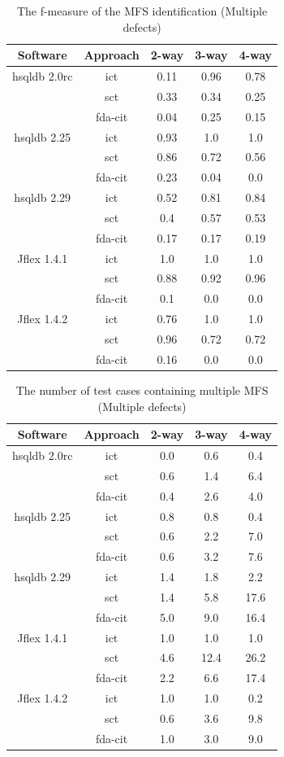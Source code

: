 \documentclass[journal,12pt,onecolumn,draftclsnofoot,]{IEEEtran}
\begin{document}
\begin{table}[ht]
\caption{The f-measure of the MFS identification (Multiple defects)}
\label{multiple_tdefects_identification}
\centering
\begin{tabular}{|c|c|c|c|c|} \hline
Software&  Approach & 2-way & 3-way & 4-way\\ \hline
hsqldb 2.0rc	&ict	&0.11	&0.96	&0.78	\\
	&sct	&0.33	&0.34	&0.25	\\
	&fda-cit	&0.04	&0.25	&0.15	\\  \hline
hsqldb 2.25	&ict	&0.93	&1.0	&1.0	\\
	&sct	&0.86	&0.72	&0.56	\\
	&fda-cit	&0.23	&0.04	&0.0	\\  \hline
hsqldb 2.29	&ict	&0.52	&0.81	&0.84	\\
	&sct	&0.4	&0.57	&0.53	\\
	&fda-cit	&0.17	&0.17	&0.19	\\  \hline
Jflex 1.4.1	&ict	&1.0	&1.0	&1.0	\\
	&sct	&0.88	&0.92	&0.96	\\
	&fda-cit	&0.1	&0.0	&0.0	\\  \hline
Jflex 1.4.2	&ict	&0.76	&1.0	&1.0	\\
	&sct	&0.96	&0.72	&0.72	\\
	&fda-cit	&0.16	&0.0	&0.0	\\  \hline
\end{tabular}
\end{table}



\begin{table}[ht]
\caption{The number of test cases containing multiple MFS (Multiple defects)}
\label{multiple_tdefects_tests_multiple}
\centering
\begin{tabular}{|c|c|c|c|c|} \hline
Software&  Approach & 2-way & 3-way & 4-way\\ \hline
hsqldb 2.0rc	&ict	&0.0	&0.6	&0.4	\\
	&sct	&0.6	&1.4	&6.4	\\
	&fda-cit	&0.4	&2.6	&4.0	\\ \hline
hsqldb 2.25	&ict	&0.8	&0.8	&0.4	\\
	&sct	&0.6	&2.2	&7.0	\\
	&fda-cit	&0.6	&3.2	&7.6	\\ \hline
hsqldb 2.29	&ict	&1.4	&1.8	&2.2	\\
	&sct	&1.4	&5.8	&17.6	\\
	&fda-cit	&5.0	&9.0	&16.4	\\ \hline
Jflex 1.4.1	&ict	&1.0	&1.0	&1.0	\\
	&sct	&4.6	&12.4	&26.2	\\
	&fda-cit	&2.2	&6.6	&17.4	\\\hline
Jflex 1.4.2	&ict	&1.0	&1.0	&0.2	\\
	&sct	&0.6	&3.6	&9.8	\\
	&fda-cit	&1.0	&3.0	&9.0	\\\hline
\end{tabular}
\end{table}
\end{document}
